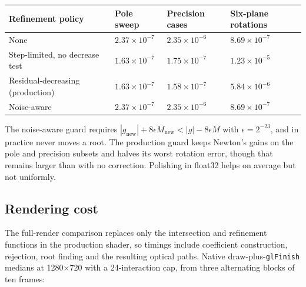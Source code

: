\documentclass[11pt,a4paper]{article}
\begin{document}
{
\begin{longtable}[]{@{}
  >{\raggedright\arraybackslash}p{}
  >{\raggedleft\arraybackslash}p{}
  >{\raggedleft\arraybackslash}p{}
  >{\raggedleft\arraybackslash}p{}@{}}
\toprule\noalign{}
\begin{minipage}[b]{\linewidth}\raggedright
Refinement policy
\end{minipage} & \begin{minipage}[b]{\linewidth}\raggedleft
Pole sweep
\end{minipage} & \begin{minipage}[b]{\linewidth}\raggedleft
Precision cases
\end{minipage} & \begin{minipage}[b]{\linewidth}\raggedleft
Six-plane rotations
\end{minipage} \\
\midrule\noalign{}
\endhead
\bottomrule\noalign{}
\endlastfoot
None & \(2.37\times10^{-7}\) & \(2.35\times10^{-6}\) &
\(8.69\times10^{-7}\) \\
Step-limited, no decrease test & \(1.63\times10^{-7}\) &
\(1.75\times10^{-7}\) & \(1.23\times10^{-5}\) \\
Residual-decreasing (production) & \(1.63\times10^{-7}\) &
\(1.58\times10^{-7}\) & \(5.84\times10^{-6}\) \\
Noise-aware & \(2.37\times10^{-7}\) & \(2.35\times10^{-6}\) &
\(8.69\times10^{-7}\) \\
\end{longtable}
}

The noise-aware guard requires
\(|g_{\mathrm{new}}|+8\epsilon M_{\mathrm{new}}<|g|-8\epsilon M\) with
\(\epsilon=2^{-23}\), and in practice never moves a root. The production
guard keeps Newton's gains on the pole and precision subsets and halves
its worst rotation error, though that remains larger than with no
correction. Polishing in float32 helps on average but not uniformly.

\subsection{Rendering cost}\label{rendering-cost}

The full-render comparison replaces only the intersection and refinement
functions in the production shader, so timings include coefficient
construction, rejection, root finding and the resulting optical paths.
Native draw-plus-\texttt{glFinish} medians at 1280×720 with a
24-interaction cap, from three alternating blocks of ten frames:
\end{document}
